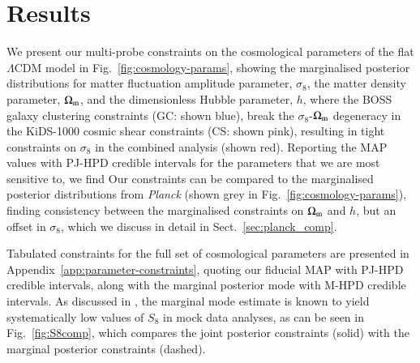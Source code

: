 \section{Results}
\label{sec:results}
We present our multi-probe constraints on the cosmological parameters of the flat $\Lambda$CDM model in Fig.~\ref{fig:cosmology-params}, showing the marginalised posterior distributions for matter fluctuation amplitude parameter, $\sigma_8$, the matter density parameter, $\Omega_{\rm m}$, and the dimensionless Hubble parameter, $h$, where the BOSS galaxy clustering constraints (GC: shown blue), break the $\sigma_8$-$\Omega_{\rm m}$ degeneracy in the KiDS-1000 cosmic shear constraints (CS: shown pink), resulting in tight constraints on $\sigma_8$ in the combined \tttp analysis (shown red). 
Reporting the MAP values with PJ-HPD credible intervals for the parameters that we are most sensitive to, we find 
Our constraints can be compared to the marginalised posterior distributions from {\it Planck} (shown grey in Fig.~\ref{fig:cosmology-params}), finding consistency between the marginalised constraints on $\Omega_{\rm m}$ and $h$, but an offset in $\sigma_8$,  which we discuss in detail in Sect.~\ref{sec:planck_comp}.

Tabulated constraints for the full set of cosmological parameters are presented in Appendix~\ref{app:parameter-constraints}, quoting our fiducial MAP with PJ-HPD credible intervals, along with the marginal posterior mode with M-HPD credible intervals. 
As discussed in \citet{joachimi/etal:inprep}, the marginal mode estimate is known to yield systematically low values of $S_8$ in mock data analyses, as can be seen in Fig.~\ref{fig:S8comp}, which compares the joint posterior constraints (solid) with the marginal posterior constraints (dashed).  

